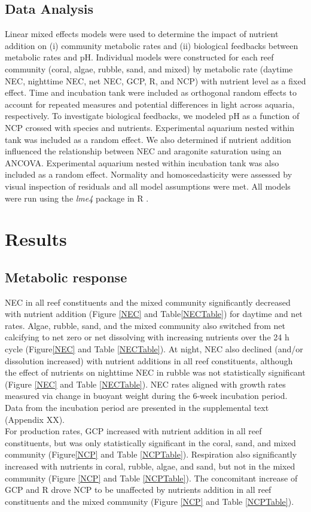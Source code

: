 \documentclass{article}%
\begin{document}
\subsection{Data Analysis}
Linear mixed effects models were used to determine the impact of nutrient addition on (i) community metabolic rates and (ii) biological feedbacks between metabolic rates and pH. Individual models were constructed for each reef community (coral, algae, rubble, sand, and mixed) by metabolic rate (daytime NEC, nighttime NEC, net NEC, GCP, R, and NCP) with nutrient level as a fixed effect. Time and incubation tank were included as orthogonal random effects to account for repeated measures and potential differences in light across aquaria, respectively. To investigate biological feedbacks, we modeled pH as a function of NCP crossed with species and nutrients. Experimental aquarium nested within tank was included as a random effect. We also determined if nutrient addition influenced the relationship between NEC and aragonite saturation using an ANCOVA. Experimental aquarium nested within incubation tank was also included as a random effect. Normality and homoscedasticity were assessed by visual inspection of residuals and all model assumptions were met. All models were run using the \textit{lme4} package in R \cite{bates2014fitting}. 

\section{Results}

\subsection{Metabolic response}
NEC in all reef constituents and the mixed community significantly decreased with nutrient addition (Figure \ref{NEC} and Table\ref{NECTable}) for daytime and net rates. Algae, rubble, sand, and the mixed community also switched from net calcifying to net zero or net dissolving with increasing nutrients over the 24 h cycle (Figure\ref{NEC} and Table \ref{NECTable}). At night, NEC also declined (and/or dissolution increased) with nutrient additions in all reef constituents, although the effect of nutrients on nighttime NEC in rubble was not statistically significant (Figure \ref{NEC} and Table \ref{NECTable}). NEC rates aligned with growth rates measured via change in buoyant weight during the 6-week incubation period. Data from the incubation period are presented in the supplemental text (Appendix XX).\\
\indent  For production rates, GCP increased with nutrient addition in all reef constituents, but was only statistically significant in the coral, sand, and mixed community (Figure\ref{NCP} and Table \ref{NCPTable}). Respiration also significantly increased with nutrients in coral, rubble, algae, and sand, but not in the mixed community (Figure \ref{NCP} and Table \ref{NCPTable}). The concomitant increase of GCP and R drove NCP to be unaffected by nutrients addition in all reef constituents and the mixed community (Figure \ref{NCP} and Table \ref{NCPTable}).
\end{document}
